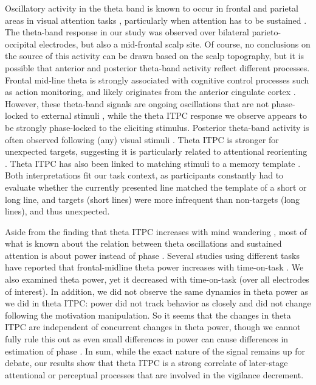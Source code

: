 \documentclass[11pt,english,]{memoir}
\begin{document}
Oscillatory activity in the theta band is known to occur in frontal and parietal areas in visual attention tasks \autocite{Demiralp1992}, particularly when attention has to be sustained \autocite{Clayton2015}. The theta-band response in our study was observed over bilateral parieto-occipital electrodes, but also a mid-frontal scalp site. Of course, no conclusions on the source of this activity can be drawn based on the scalp topography, but it is possible that anterior and posterior theta-band activity reflect different processes. Frontal mid-line theta is strongly associated with cognitive control processes such as action monitoring, and likely originates from the anterior cingulate cortex \autocites{Cavanagh2014}{Narayanan2013}. However, these theta-band signals are ongoing oscillations that are not phase-locked to external stimuli \autocite{Cohen2013}, while the theta ITPC response we observe appears to be strongly phase-locked to the eliciting stimulus. Posterior theta-band activity is often observed following (any) visual stimuli \autocite{Klimesch2007}. Theta ITPC is stronger for unexpected targets, suggesting it is particularly related to attentional reorienting \autocite{Daitch2013}. Theta ITPC has also been linked to matching stimuli to a memory template \autocites{Freunberger2007}{Rizzuto2006}. Both interpretations fit our task context, as participants constantly had to evaluate whether the currently presented line matched the template of a short or long line, and targets (short lines) were more infrequent than non-targets (long lines), and thus unexpected.

Aside from the finding that theta ITPC increases with mind wandering \autocite{Baird2014}, most of what is known about the relation between theta oscillations and sustained attention is about power instead of phase \autocite{Clayton2015}. Several studies using different tasks have reported that frontal-midline theta power increases with time-on-task \autocites{Boksem2005}{Umemoto2018}{Wascher2014}[but see][]{Bonnefond2011}. We also examined theta power, yet it decreased with time-on-task (over all electrodes of interest). In addition, we did not observe the same dynamics in theta power as we did in theta ITPC: power did not track behavior as closely and did not change following the motivation manipulation. So it seems that the changes in theta ITPC are independent of concurrent changes in theta power, though we cannot fully rule this out as even small differences in power can cause differences in estimation of phase \autocite{VanDiepen2018}. In sum, while the exact nature of the signal remains up for debate, our results show that theta ITPC is a strong correlate of later-stage attentional or perceptual processes that are involved in the vigilance decrement.
\end{document}
